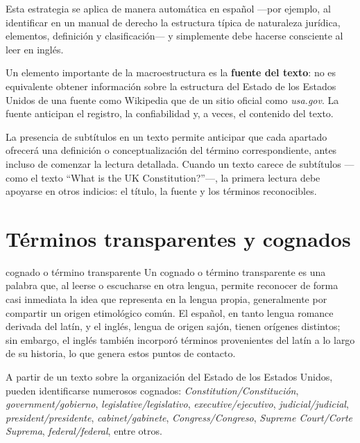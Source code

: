 \documentclass[12pt,oneside]{book}
\begin{document}
Esta estrategia se aplica de manera automática en español ---por ejemplo, al identificar en un manual de derecho la estructura típica de naturaleza jurídica, elementos, definición y clasificación--- y simplemente debe hacerse consciente al leer en inglés.

Un elemento importante de la macroestructura es la \textbf{fuente del texto}: no es equivalente obtener información sobre la estructura del Estado de los Estados Unidos de una fuente como Wikipedia que de un sitio oficial como \textit{usa.gov}. La fuente anticipan el registro, la confiabilidad y, a veces, el contenido del texto.

\begin{note}
La presencia de subtítulos en un texto permite anticipar que cada apartado ofrecerá una definición o conceptualización del término correspondiente, antes incluso de comenzar la lectura detallada. Cuando un texto carece de subtítulos ---como el texto ``What is the UK Constitution?''---, la primera lectura debe apoyarse en otros indicios: el título, la fuente y los términos reconocibles.
\end{note}

\section{Términos transparentes y cognados}

\begin{definition}{cognado o término transparente}
Un cognado o término transparente es una palabra que, al leerse o escucharse en otra lengua, permite reconocer de forma casi inmediata la idea que representa en la lengua propia, generalmente por compartir un origen etimológico común. El español, en tanto lengua romance derivada del latín, y el inglés, lengua de origen sajón, tienen orígenes distintos; sin embargo, el inglés también incorporó términos provenientes del latín a lo largo de su historia, lo que genera estos puntos de contacto.
\end{definition}

A partir de un texto sobre la organización del Estado de los Estados Unidos, pueden identificarse numerosos cognados: \textit{Constitution/Constitución}, \textit{government/gobierno}, \textit{legislative/legislativo}, \textit{executive/ejecutivo}, \textit{judicial/judicial}, \textit{president/presidente}, \textit{cabinet/gabinete}, \textit{Congress/Congreso}, \textit{Supreme Court/Corte Suprema}, \textit{federal/federal}, entre otros.
\end{document}
